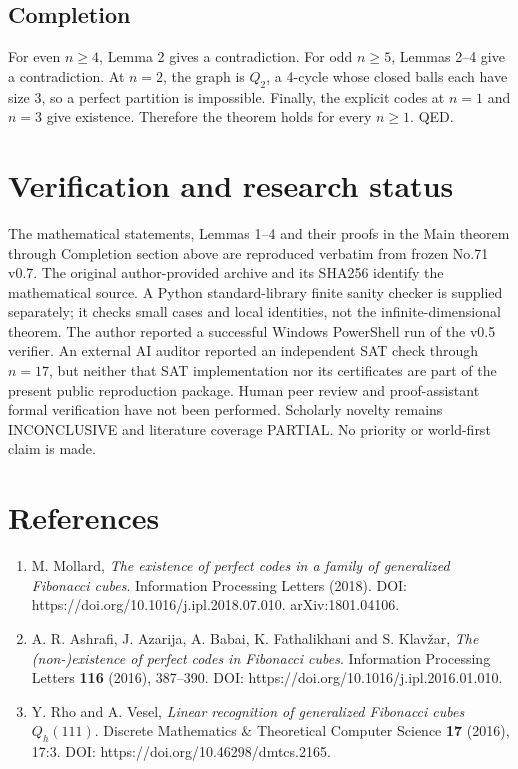 \documentclass[
  11pt,
]{article}
\providecommand{\tightlist}{%
  \setlength{\itemsep}{0pt}\setlength{\parskip}{0pt}}
\begin{document}
\subsection{Completion}\label{completion}

For even \(n\ge 4\), Lemma 2 gives a contradiction. For odd \(n\ge 5\),
Lemmas 2--4 give a contradiction. At \(n=2\), the graph is \(Q_2\), a
4-cycle whose closed balls each have size 3, so a perfect partition is
impossible. Finally, the explicit codes at \(n=1\) and \(n=3\) give
existence. Therefore the theorem holds for every \(n\ge 1\). QED.

\section{Verification and research
status}\label{verification-and-research-status}

The mathematical statements, Lemmas 1--4 and their proofs in the Main
theorem through Completion section above are reproduced verbatim from
frozen No.71 v0.7. The original author-provided archive and its SHA256
identify the mathematical source. A Python standard-library finite
sanity checker is supplied separately; it checks small cases and local
identities, not the infinite-dimensional theorem. The author reported a
successful Windows PowerShell run of the v0.5 verifier. An external AI
auditor reported an independent SAT check through \(n=17\), but neither
that SAT implementation nor its certificates are part of the present
public reproduction package. Human peer review and proof-assistant
formal verification have not been performed. Scholarly novelty remains
INCONCLUSIVE and literature coverage PARTIAL. No priority or world-first
claim is made.

\section{References}\label{references}

\begin{enumerate}
\def\labelenumi{\arabic{enumi}.}
\tightlist
\item
  M. Mollard, \emph{The existence of perfect codes in a family of
  generalized Fibonacci cubes}. Information Processing Letters (2018).
  DOI: https://doi.org/10.1016/j.ipl.2018.07.010. arXiv:1801.04106.
\item
  A. R. Ashrafi, J. Azarija, A. Babai, K. Fathalikhani and S. Klavžar,
  \emph{The (non-)existence of perfect codes in Fibonacci cubes}.
  Information Processing Letters \textbf{116} (2016), 387--390. DOI:
  https://doi.org/10.1016/j.ipl.2016.01.010.
\item
  Y. Rho and A. Vesel, \emph{Linear recognition of generalized Fibonacci
  cubes \(Q_h(111)\)}. Discrete Mathematics \& Theoretical Computer
  Science \textbf{17} (2016), 17:3. DOI:
  https://doi.org/10.46298/dmtcs.2165.
\end{enumerate}
\end{document}
